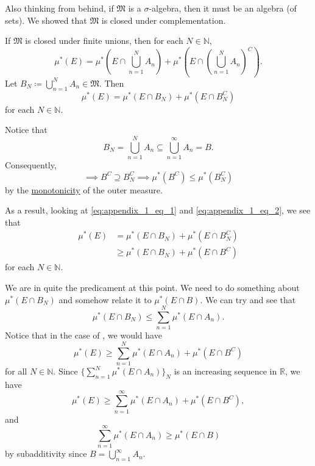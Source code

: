 \documentclass[notoc,notitlepage]{tufte-book}
\begin{document}
Also thinking from behind,
if $\mathfrak{M}$ is a $\sigma$-algebra, 
then it must be an algebra (of sets).
We showed that $\mathfrak{M}$ is closed under complementation.

If $\mathfrak{M}$ is closed under finite unions,
then for each $N \in \mathbb{N}$,
\begin{equation*}
  \mu^*(E) = \mu^* \left( E \cap \bigcup_{n=1}^{N} A_n \right)
    + \mu^* \left( E \cap \left( \bigcup_{n=1}^{N} A_n \right)^C \right).
\end{equation*}
Let $B_N \coloneqq \bigcup_{n=1}^{N} A_n \in \mathfrak{M}$. Then
\begin{equation}\tag{$\dagger$}\label{eq:appendix_1_eq_2}
  \mu^*(E) = \mu^* (E \cap B_N) + \mu^* (E \cap B_N^C)
\end{equation}
for each $N \in \mathbb{N}$.

Notice that
\begin{equation*}
  B_N = \bigcup_{n=1}^{N} A_n \subseteq \bigcup_{n=1}^{\infty} A_n = B.
\end{equation*}
Consequently,
\begin{equation*}
  \implies B^C \supseteq B_N^C \implies \mu^*(B^C) \leq \mu^*(B_N^C)
\end{equation*}
by the \hyperref[defn:outer_measure]{monotonicity} of the outer measure.

As a result, looking at \cref{eq:appendix_1_eq_1} and \cref{eq:appendix_1_eq_2},
we see that
\begin{align*}
  \mu^*(E) &= \mu^*(E \cap B_N) + \mu^*(E \cap B_N^C) \\
           &\geq \mu^*(E \cap B_N) + \mu^*(E \cap B^C)
\end{align*}
for each $N \in \mathbb{N}$.

We are in quite the predicament at this point.
We need to do something about $\mu^*(E \cap B_N)$
and somehow relate it to $\mu^*(E \cap B)$.
We can try and see that
\begin{equation*}
  \mu^*(E \cap B_N) \leq \sum_{n=1}^{N} \mu^*(E \cap A_n).
\end{equation*}
Notice that in the case of , we would have
\begin{equation*}
  \mu^*(E) \geq \sum_{n=1}^{N} \mu^*(E \cap A_n) + \mu^*(E \cap B^C)
\end{equation*}
for all $N \in \mathbb{N}$.
Since $\{ \sum_{n=1}^{N} \mu^*(E \cap A_n) \}_{N}$ is an increasing sequence
in $\mathbb{R}$, we have
\begin{equation*}
  \mu^*(E) \geq \sum_{n=1}^{\infty} \mu^*(E \cap A_n) + \mu^*(E \cap B^C),
\end{equation*}
and
\begin{equation*}
  \sum_{n=1}^{\infty} \mu^*(E \cap A_n) \geq \mu^*(E \cap B)
\end{equation*}
by subadditivity since $B = \bigcup_{n=1}^{\infty} A_n$.
\end{document}
